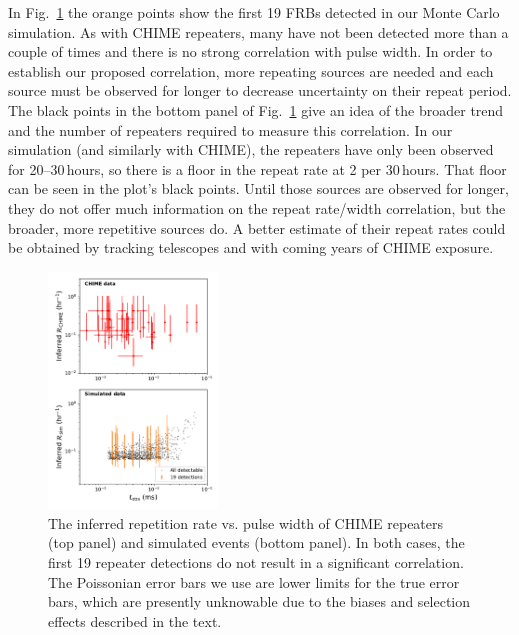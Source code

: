 \documentclass[fleqn,usenatbib]{mnras}
\begin{document}
In Fig.~\ref{fig-chime-repeaters} the 
orange points show the first 19 FRBs detected in our Monte Carlo simulation. 
As with CHIME repeaters, many have not been detected more than a 
couple of times and there is no strong correlation with pulse width. 
In order to establish our proposed correlation, more repeating 
sources are needed and each source must be observed for longer to decrease 
uncertainty on their repeat period. The black points 
in the bottom panel of Fig.~\ref{fig-chime-repeaters} give 
an idea of the broader trend and the number of repeaters required to measure this correlation. In our simulation 
(and similarly with CHIME), the repeaters have only been 
observed for 20--30\,hours, so there is a floor in the repeat rate at 2 per 30\,hours. That floor can be seen in the plot's black points. 
Until those sources are observed for longer, they do not offer 
much information on the repeat rate/width correlation, 
but the broader, more repetitive sources do.
A better estimate of their repeat rates could be obtained by 
tracking telescopes and with coming years of CHIME exposure.

\begin{figure}
	\centering
	\includegraphics[width=0.4\textwidth]{chime_repeat_rate_v2.pdf}
	\caption{The inferred repetition rate vs. pulse width 
	of CHIME repeaters (top panel) and simulated events 
	(bottom panel). In both cases, the first 19 repeater detections do not 
	result in a significant correlation. The Poissonian error 
	bars we use are lower limits for the true 
	error bars, which are presently unknowable due to the biases and 
	selection effects described in the text.}
	\label{fig-chime-repeaters}
\end{figure}
\end{document}
